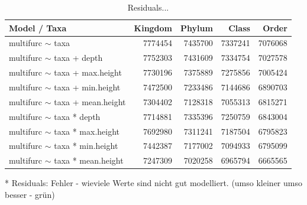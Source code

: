         \begin{table}[h]
          \begin{center}
              \begin{tabular}{ |l|r|r|r|r| }
                \hline
                Model / Taxa & Kingdom & Phylum & Class & Order \\
                \hline \hline
                multifurc $\sim$ taxa & 7774454 & \cellcolor{green!10}7435700 & \cellcolor{green!15}7337241 & \cellcolor{green!30}7076068 \\
                \hline
                multifurc $\sim$ taxa + depth & 7752303 & \cellcolor{green!10}7431609 & \cellcolor{green!15}7334754 & \cellcolor{green!30}7027578 \\
                multifurc $\sim$ taxa + max.height & 7730196 & \cellcolor{green!15}7375889 & \cellcolor{green!20}7275856 & \cellcolor{green!30}7005424 \\
                multifurc $\sim$ taxa + min.height & \cellcolor{green!10}7472500 & \cellcolor{green!20}7233486 & \cellcolor{green!25}7144686 & \cellcolor{green!40}6890703 \\
                multifurc $\sim$ taxa + mean.height & \cellcolor{green!15}7304402 & \cellcolor{green!25}7128318 & \cellcolor{green!30}7055313 & \cellcolor{green!40}6815271 \\
                \hline
                multifurc $\sim$ taxa * depth & 7714881 & \cellcolor{green!15}7335396 & \cellcolor{green!20}7250759 & \cellcolor{green!40}6843004 \\
                multifurc $\sim$ taxa * max.height & \cellcolor{green!5}7692980 & \cellcolor{green!15}7311241 & \cellcolor{green!25}7187504 & \cellcolor{green!45}6795823 \\
                multifurc $\sim$ taxa * min.height & \cellcolor{green!10}7442387 & \cellcolor{green!25}7177002 & \cellcolor{green!30}7094933 & \cellcolor{green!45}6795099 \\
                multifurc $\sim$ taxa * mean.height & \cellcolor{green!20}7247309 & \cellcolor{green!30}7020258 & \cellcolor{green!35}6965794 & \cellcolor{green!50}6665565 \\
                \hline
              \end{tabular}
          \end{center}
          \caption{Residuals...}
          \label{table:...} 
        \end{table}
        * Residuals: Fehler - wieviele Werte sind nicht gut modelliert. (umso kleiner umso besser - grün) \\

